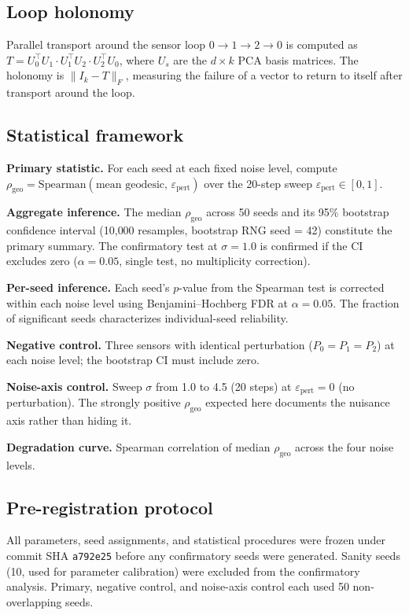 \documentclass[11pt]{article}
\newcommand{\eps}{\varepsilon}
\newcommand{\epspert}{\eps_\mathrm{pert}}
\newcommand{\rhogeo}{\rho_\mathrm{geo}}
\begin{document}
\subsection{Loop holonomy}

Parallel transport around the sensor loop $0 \to 1 \to 2 \to 0$
is computed as $T = U_0^\top U_1 \cdot U_1^\top U_2 \cdot
U_2^\top U_0$, where $U_s$ are the $d \times k$ PCA basis matrices.
The holonomy is $\|I_k - T\|_F$, measuring the failure of a vector
to return to itself after transport around the loop.

\subsection{Statistical framework}

\textbf{Primary statistic.}  For each seed at each fixed noise
level, compute $\rhogeo = \mathrm{Spearman}(\text{mean geodesic},
\, \epspert)$ over the 20-step sweep $\epspert \in [0, 1]$.

\textbf{Aggregate inference.}  The median $\rhogeo$ across 50 seeds
and its 95\% bootstrap confidence interval (10{,}000 resamples,
bootstrap RNG seed = 42) constitute the primary summary.  The
confirmatory test at $\sigma = 1.0$ is confirmed if the CI excludes
zero ($\alpha = 0.05$, single test, no multiplicity correction).

\textbf{Per-seed inference.}  Each seed's $p$-value from the
Spearman test is corrected within each noise level using
Benjamini--Hochberg FDR at $\alpha = 0.05$.  The fraction of
significant seeds characterizes individual-seed reliability.

\textbf{Negative control.}  Three sensors with identical
perturbation ($P_0 = P_1 = P_2$) at each noise level; the
bootstrap CI must include zero.

\textbf{Noise-axis control.}  Sweep $\sigma$ from 1.0 to 4.5 (20
steps) at $\epspert = 0$ (no perturbation).  The strongly positive
$\rhogeo$ expected here documents the nuisance axis rather than
hiding it.

\textbf{Degradation curve.}  Spearman correlation of median
$\rhogeo$ across the four noise levels.

\subsection{Pre-registration protocol}

All parameters, seed assignments, and statistical procedures were
frozen under commit SHA \texttt{a792e25} before any confirmatory
seeds were generated.  Sanity seeds (10, used for parameter
calibration) were excluded from the confirmatory analysis.
Primary, negative control, and noise-axis control each used 50
non-overlapping seeds.
\end{document}

